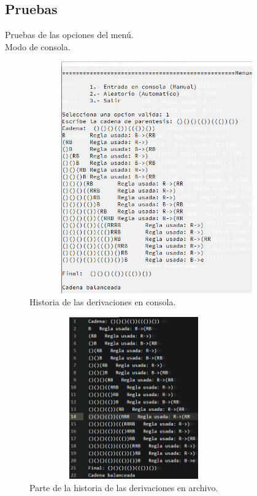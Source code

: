 	\subsection{Pruebas}
	Pruebas de las opciones del menú.
	\\
	{\large Modo de consola.}
	\begin{figure}[H]
		\begin{center}
			\includegraphics[width=11cm, height=10cm]{img/parseo-manual-consola.png}
			\caption{Historia de las derivaciones en consola.}
			\label{fig:parseo1}
		\end{center}
	\end{figure}
	\begin{figure}[H]
		\begin{center}
			\includegraphics[width=9cm, height=7cm]{img/parseo-manual-archivo.png}
			\caption{Parte de la historia de las derivaciones en archivo.}
			\label{fig:parseo2}
		\end{center}
	\end{figure}
